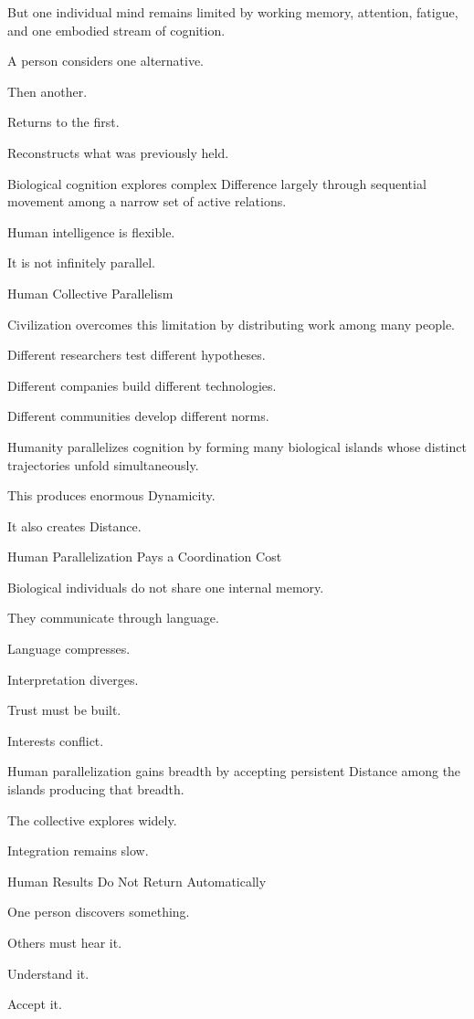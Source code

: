 But one individual mind remains limited by working memory, attention, fatigue, and one embodied stream of cognition.

A person considers one alternative.

Then another.

Returns to the first.

Reconstructs what was previously held.

Biological cognition explores complex Difference largely through sequential movement among a narrow set of active relations.

Human intelligence is flexible.

It is not infinitely parallel.

Human Collective Parallelism

Civilization overcomes this limitation by distributing work among many people.

Different researchers test different hypotheses.

Different companies build different technologies.

Different communities develop different norms.

Humanity parallelizes cognition by forming many biological islands whose distinct trajectories unfold simultaneously.

This produces enormous Dynamicity.

It also creates Distance.

Human Parallelization Pays a Coordination Cost

Biological individuals do not share one internal memory.

They communicate through language.

Language compresses.

Interpretation diverges.

Trust must be built.

Interests conflict.

Human parallelization gains breadth by accepting persistent Distance among the islands producing that breadth.

The collective explores widely.

Integration remains slow.

Human Results Do Not Return Automatically

One person discovers something.

Others must hear it.

Understand it.

Accept it.

